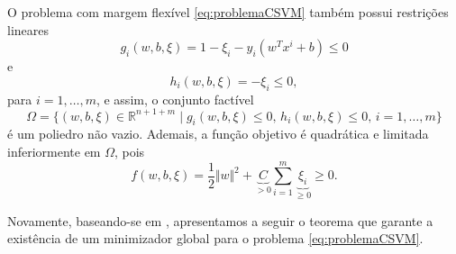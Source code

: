 \documentclass[12pt,a4paper]{scrartcl}
\def\RR{\mathds{R}}
\theoremstyle{definition}%
\begin{document}

O problema com margem flexível \eqref{eq:problemaCSVM} também possui restrições lineares 
\[ 
g_{i}(w,b,\xi) = 1-\xi_{i} - y_i(w^{T}x^{i}+b) \leq 0 
\]
e 
\[
h_{i}(w,b,\xi) = - \xi_{i} \leq 0,
\]
para $i=1, \ldots, m$, e assim, o conjunto factível
\[ \label{conjunto_factivel_problema_SVM_flexivel}
\Omega = \{(w,b,\xi) \in \RR^{n+1+m} \mid g_{i}(w,b,\xi) \leq 0, \, h_{i}(w,b,\xi) \leq 0, \, i=1, \ldots, m \} 
\]
é um poliedro não vazio. Ademais, a função objetivo é quadrática e limitada inferiormente em $\Omega$, pois 
\[ \label{funcao_objetivo_problema_SVM_flexivel_limitada}
f(w,b,\xi) = \dfrac{1}{2} \Vert w\Vert^{2} + \underbrace{C}_{> 0} \sum_{i=1}^{m} \underbrace{\xi_{i}}_{\geq 0} \geq 0.
\]

Novamente, baseando-se em \textcite[Teo. 2.13]{Evelin2017}, apresentamos a seguir o teorema que garante a existência de um minimizador global para o problema \eqref{eq:problemaCSVM}.
\end{document}
